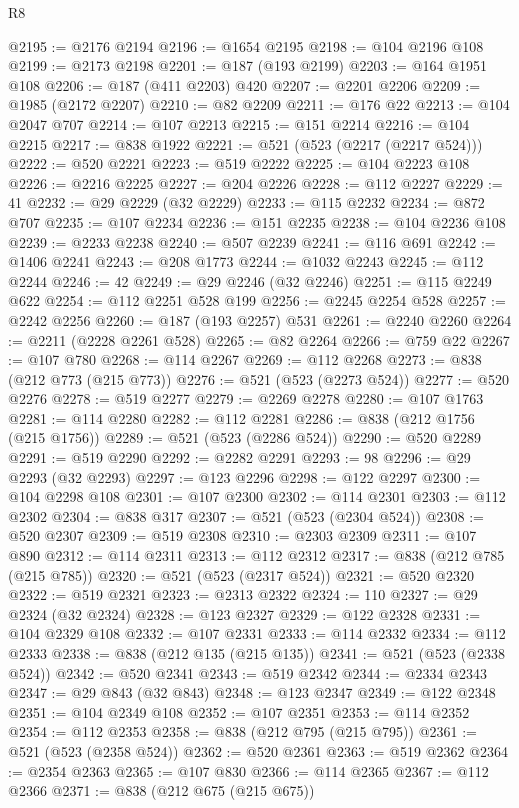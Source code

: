 \begin{lexlean}{R8}
\begin{coremodule}
@2195 := @2176 @2194
@2196 := @1654 @2195
@2198 := @104 @2196 @108
@2199 := @2173 @2198
@2201 := @187 (@193 @2199)
@2203 := @164 @1951 @108
@2206 := @187 (@411 @2203) @420
@2207 := @2201 @2206
@2209 := @1985 (@2172 @2207)
@2210 := @82 @2209
@2211 := @176 @22
@2213 := @104 @2047 @707
@2214 := @107 @2213
@2215 := @151 @2214
@2216 := @104 @2215
@2217 := @838 @1922
@2221 := @521 (@523 (@2217 (@2217 @524)))
@2222 := @520 @2221
@2223 := @519 @2222
@2225 := @104 @2223 @108
@2226 := @2216 @2225
@2227 := @204 @2226
@2228 := @112 @2227
@2229 := 41
@2232 := @29 @2229 (@32 @2229)
@2233 := @115 @2232
@2234 := @872 @707
@2235 := @107 @2234
@2236 := @151 @2235
@2238 := @104 @2236 @108
@2239 := @2233 @2238
@2240 := @507 @2239
@2241 := @116 @691
@2242 := @1406 @2241
@2243 := @208 @1773
@2244 := @1032 @2243
@2245 := @112 @2244
@2246 := 42
@2249 := @29 @2246 (@32 @2246)
@2251 := @115 @2249 @622
@2254 := @112 @2251 @528 @199
@2256 := @2245 @2254 @528
@2257 := @2242 @2256
@2260 := @187 (@193 @2257) @531
@2261 := @2240 @2260
@2264 := @2211 (@2228 @2261 @528)
@2265 := @82 @2264
@2266 := @759 @22
@2267 := @107 @780
@2268 := @114 @2267
@2269 := @112 @2268
@2273 := @838 (@212 @773 (@215 @773))
@2276 := @521 (@523 (@2273 @524))
@2277 := @520 @2276
@2278 := @519 @2277
@2279 := @2269 @2278
@2280 := @107 @1763
@2281 := @114 @2280
@2282 := @112 @2281
@2286 := @838 (@212 @1756 (@215 @1756))
@2289 := @521 (@523 (@2286 @524))
@2290 := @520 @2289
@2291 := @519 @2290
@2292 := @2282 @2291
@2293 := 98
@2296 := @29 @2293 (@32 @2293)
@2297 := @123 @2296
@2298 := @122 @2297
@2300 := @104 @2298 @108
@2301 := @107 @2300
@2302 := @114 @2301
@2303 := @112 @2302
@2304 := @838 @317
@2307 := @521 (@523 (@2304 @524))
@2308 := @520 @2307
@2309 := @519 @2308
@2310 := @2303 @2309
@2311 := @107 @890
@2312 := @114 @2311
@2313 := @112 @2312
@2317 := @838 (@212 @785 (@215 @785))
@2320 := @521 (@523 (@2317 @524))
@2321 := @520 @2320
@2322 := @519 @2321
@2323 := @2313 @2322
@2324 := 110
@2327 := @29 @2324 (@32 @2324)
@2328 := @123 @2327
@2329 := @122 @2328
@2331 := @104 @2329 @108
@2332 := @107 @2331
@2333 := @114 @2332
@2334 := @112 @2333
@2338 := @838 (@212 @135 (@215 @135))
@2341 := @521 (@523 (@2338 @524))
@2342 := @520 @2341
@2343 := @519 @2342
@2344 := @2334 @2343
@2347 := @29 @843 (@32 @843)
@2348 := @123 @2347
@2349 := @122 @2348
@2351 := @104 @2349 @108
@2352 := @107 @2351
@2353 := @114 @2352
@2354 := @112 @2353
@2358 := @838 (@212 @795 (@215 @795))
@2361 := @521 (@523 (@2358 @524))
@2362 := @520 @2361
@2363 := @519 @2362
@2364 := @2354 @2363
@2365 := @107 @830
@2366 := @114 @2365
@2367 := @112 @2366
@2371 := @838 (@212 @675 (@215 @675))

\end{coremodule}
\end{lexlean}
